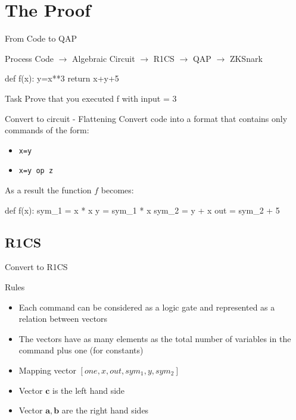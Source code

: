 \documentclass[handout]{beamer}
\begin{document}
\section{The Proof}

\begin{frame}[fragile]{From Code to QAP}

\begin{block}{Process}
Code $\rightarrow$ Algebraic Circuit $\rightarrow$ R1CS 
$\rightarrow$ QAP $\rightarrow$ ZKSnark
\end{block}

\begin{python}
    def f(x): 
        y=x**3 
        return x+y+5   
\end{python}

\begin{block}{Task}
Prove that you executed f with input = $3$
\end{block}
\end{frame}

\begin{frame}[fragile]{Convert to circuit - Flattening}
    Convert code into a format that contains only commands of the form:
    \begin{itemize}
        \item \texttt{x=y}
        \item \texttt{x=y op z}  
    \end{itemize}
    
    As a result the function $f$ becomes:    
   \begin{python}
        def f(x): 
            sym_1 = x * x 
            y = sym_1 * x    
            sym_2 = y + x   
            out = sym_2 + 5
    \end{python}    
\end{frame}

\subsection{R1CS}
\begin{frame}{Convert to R1CS} 
\begin{block}{Rules}
    \begin{itemize}
        \item Each command can be considered as a logic gate and represented as a relation between vectors
        \item The vectors have as many elements as the total number of variables in the command plus one (for constants)
        \item Mapping vector $ [ one,  x,  out,  sym_1,  y,  sym_2 ] $
        \item Vector $\bm{c}$ is the left hand side
        \item Vector $\bm{a}, \bm{b}$ are the right hand sides
    \end{itemize}  
\end{block}

\end{frame}
 
\end{document}
